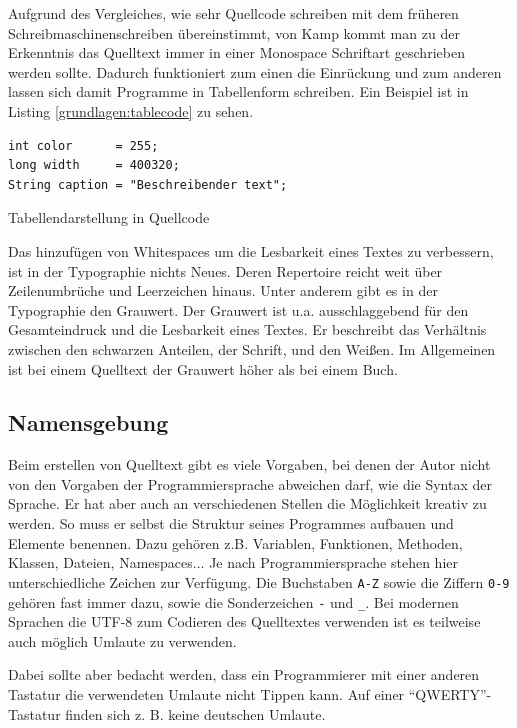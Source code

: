 Aufgrund des Vergleiches, wie sehr Quellcode schreiben mit dem früheren Schreibmaschinenschreiben übereinstimmt, von Kamp\cite{Kamp} kommt man zu der Erkenntnis das Quelltext immer in einer Monospace Schriftart geschrieben werden sollte\cite[S. 2]{Green}. Dadurch funktioniert zum einen die Einrückung und zum anderen lassen sich damit Programme in Tabellenform schreiben. Ein Beispiel ist in Listing \ref{grundlagen:tablecode} zu sehen.

\begin{listing}[H]
    \begin{verbatim}
int color      = 255;
long width     = 400320;
String caption = "Beschreibender text";
    \end{verbatim}
    \caption{Tabellendarstellung in Quellcode}
    \label{grundlagen:tablecode}
\end{listing}

Das hinzufügen von Whitespaces um die Lesbarkeit eines Textes zu verbessern, ist in der Typographie nichts Neues. Deren Repertoire reicht weit über Zeilenumbrüche und Leerzeichen hinaus. Unter anderem gibt es in der Typographie den Grauwert. Der Grauwert ist u.a. ausschlaggebend für den Gesamteindruck und die Lesbarkeit
eines Textes. Er beschreibt das Verhältnis zwischen den schwarzen Anteilen, der Schrift, und den Weißen. Im Allgemeinen ist bei einem Quelltext der Grauwert höher als bei einem Buch.  \cite{Beinert}


\subsection{Namensgebung}

Beim erstellen von Quelltext gibt es viele Vorgaben, bei denen der Autor nicht von den Vorgaben der Programmiersprache abweichen darf, wie die Syntax der Sprache.
Er hat aber auch an verschiedenen Stellen die Möglichkeit kreativ zu werden. So muss er selbst die Struktur seines Programmes aufbauen und Elemente benennen.
Dazu gehören z.B. Variablen, Funktionen, Methoden, Klassen, Dateien, Namespaces...
Je nach Programmiersprache stehen hier unterschiedliche Zeichen zur Verfügung.
Die Buchstaben \texttt{A-Z} sowie die Ziffern \texttt{0-9} gehören fast immer dazu, sowie die
Sonderzeichen \texttt{-} und \texttt{\_}. Bei modernen Sprachen die UTF-8
zum Codieren des Quelltextes verwenden ist es teilweise auch möglich Umlaute zu verwenden.

Dabei sollte aber bedacht werden, dass ein Programmierer mit einer anderen
Tastatur die verwendeten Umlaute nicht Tippen kann. Auf einer \enquote{QWERTY}-Tastatur finden sich z. B. keine deutschen Umlaute.

